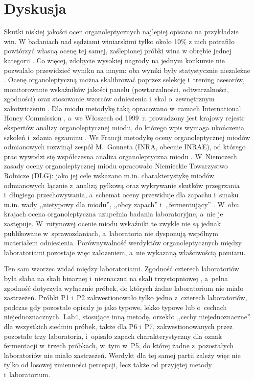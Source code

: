 
\section{Dyskusja}

Skutki niskiej jakości ocen organoleptycznych najlepiej opisano na przykładzie
win. W badaniach nad sędziami winiarskimi tylko około 10\% z nich
potrafiło powtórzyć własną ocenę tej samej, zaślepionej próbki wina
w obrębie jednej kategorii \cite{hodgson2008judge}. Co więcej, zdobycie
wysokiej nagrody na jednym konkursie nie pozwalało przewidzieć wyniku na
innym: oba wyniki były statystycznie niezależne \cite{hodgson2009concordance}. 
Ocenę organoleptyczną można skalibrować poprzez selekcję i~trening asesorów,
monitorowanie wskaźników jakości panelu (powtarzalności, odtwarzalności,
zgodności) oraz stosowanie wzorców odniesienia i~skal o~zewnętrznym
zakotwiczeniu \cite{sipos2021panel,bartoshuk2004valid}. Dla miodu metodykę
taką opracowano w~ramach International Honey Commission \cite{Piana2004},
a~we Włoszech od 1999~r. prowadzony jest krajowy rejestr ekspertów analizy
organoleptycznej miodu, do którego wpis wymaga ukończenia szkoleń i~zdania
egzaminu \cite{AlboMiele1999}. We Francji metodykę oceny
organoleptycznej miodów odmianowych rozwinął zespół M.~Gonneta (INRA,
obecnie INRAE), od którego prac wywodzi się współczesna analiza
organoleptyczna miodu \cite{Piana2004}. W~Niemczech zasady oceny
organoleptycznej miodu opracowało Niemieckie Towarzystwo Rolnicze (DLG):
jako jej cele wskazano m.in. charakterystykę miodów odmianowych łącznie
z~analizą pyłkową oraz wykrywanie skutków przegrzania i~długiego
przechowywania, a~schemat oceny przewiduje dla zapachu i~smaku m.in. wady
,,nietypowy dla miodu'', ,,obcy zapach'' i~,,fermentujący'' \cite{DLG2015}.
W~obu krajach ocena organoleptyczna uzupełnia badania laboratoryjne, a~nie
je zastępuje. W~rutynowej ocenie
miodu wskaźniki te zwykle nie są jednak publikowane w~sprawozdaniach, a~laboratoria
nie dysponują wspólnym materiałem odniesienia. Porównywalność werdyktów
organoleptycznych między laboratoriami pozostaje więc założeniem, a~nie
wykazaną właściwością pomiaru.

Ten sam wzorzec widać między laboratoriami. Zgodność czterech laboratoriów
była słaba na skali binarnej i~nieznaczna na skali trzystopniowej
\cite{LandisKoch1977}, a~pełna zgodność dotyczyła wyłącznie próbek, do
których żadne laboratorium nie miało zastrzeżeń. Próbki P1 i~P2
zakwestionowało tylko jedno z~czterech laboratoriów, podczas gdy pozostałe
opisały je jako typowe, lekko typowe lub o~cechach niejednoznacznych.
Lab4, stosujące inną metodę, orzekło ,,cechy niejednoznaczne'' dla
wszystkich siedmiu próbek, także dla P6 i~P7, zakwestionowanych przez
pozostałe trzy laboratoria, i~opisało zapach charakterystyczny dla oznak
fermentacji w~trzech próbkach, w~tym w~P5, do której żadne z~pozostałych
laboratoriów nie miało zastrzeżeń. Werdykt
dla tej samej partii zależy więc nie tylko od losowej zmienności percepcji,
lecz także od przyjętej metody i~laboratorium.

